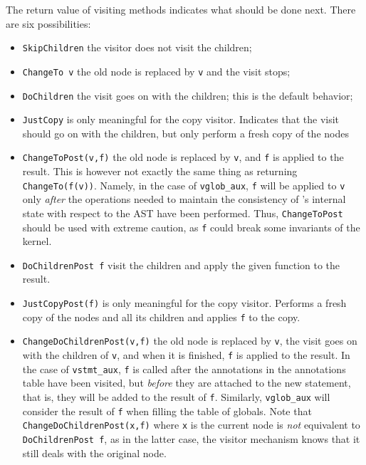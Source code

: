 The return value of visiting methods indicates what should be done
next. There are six possibilities:
\begin{itemize}
\item \verb+SkipChildren+ the visitor
  does not visit the children;
\item \verb+ChangeTo v+ the old node is
  replaced by \verb+v+ and the visit stops;
\item \verb+DoChildren+ the visit goes
  on with the children; this is the default behavior;
\item \verb+JustCopy+ is only meaningful
  for the copy visitor. Indicates that the visit should go on with the children,
  but only perform a fresh copy of the nodes
\item \verb+ChangeToPost(v,f)+ the old
  node is replaced by \verb+v+, and \verb+f+ is applied to the result. This is
  however not exactly the same thing as returning \verb+ChangeTo(f(v))+. Namely,
  in the case of \verb+vglob_aux+, \verb+f+ will be applied to \verb+v+ only
  \emph{after} the operations needed to maintain the consistency of \framac's
  internal state with respect to the AST have been performed.  Thus,
  \verb+ChangeToPost+ should be used with extreme caution, as \verb+f+ could
  break some invariants of the kernel.
\item \verb+DoChildrenPost f+
  visit the children and apply the given function to the result.
\item \verb+JustCopyPost(f)+
  is only
  meaningful for the copy visitor. Performs a fresh copy of the nodes
  and all its children and applies \verb+f+ to the copy.
\item
  \verb+ChangeDoChildrenPost(v,f)+%
  the old node is replaced by \verb+v+, the visit goes on with the children of
  \verb+v+, and when it is finished, \verb+f+ is applied to the result. In the
  case of \verb+vstmt_aux+, \verb+f+ is called after the annotations in the
  annotations table have been visited, but \emph{before} they are attached to
  the new statement, that is, they will be added to the result of
  \verb+f+. Similarly, \verb+vglob_aux+ will consider the
   result of \verb+f+ when filling the table of globals. Note that
   \verb+ChangeDoChildrenPost(x,f)+ where \verb+x+ is the current node
   is \textit{not} equivalent to \verb+DoChildrenPost f+, as in the latter
   case, the visitor mechanism knows that it still deals with the original node.
\end{itemize}

